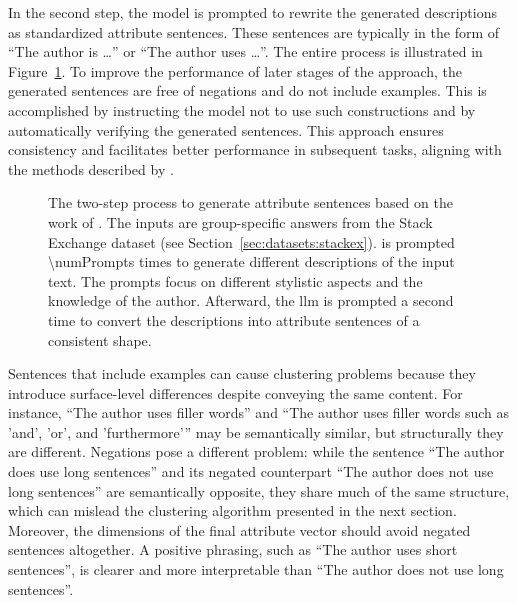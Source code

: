 In the second step, the model is prompted to rewrite the generated descriptions as standardized attribute sentences. These sentences are typically in the form of \enquote{The author is \ldots} or \enquote{The author uses \ldots}. The entire process is illustrated in Figure~\ref{fig:attributeSentenceGeneration}. To improve the performance of later stages of the approach, the generated sentences are free of negations and do not include examples. This is accomplished by instructing the model not to use such constructions and by automatically verifying the generated sentences. This approach ensures consistency and facilitates better performance in subsequent tasks, aligning with the methods described by \citet{patelLearningInterpretableStyle2023}.

\begin{figure}[h!t]
  
  \caption{The two-step process to generate attribute sentences based on the work of \citet{patelLearningInterpretableStyle2023}. The inputs are group-specific answers from the Stack Exchange dataset (see Section~\ref{sec:datasets:stackex}).  is prompted \num{\numPrompts} times to generate different descriptions of the input text. The prompts focus on different stylistic aspects and the knowledge of the author. Afterward, the \ac{llm} is prompted a second time to convert the descriptions into attribute sentences of a consistent shape.}%
  \label{fig:attributeSentenceGeneration}
\end{figure}

Sentences that include examples can cause clustering problems because they introduce surface-level differences despite conveying the same content. For instance, \enquote{The author uses filler words} and \enquote{The author uses filler words such as 'and', 'or', and 'furthermore'} may be semantically similar, but structurally they are different. Negations pose a different problem: while the sentence \enquote{The author does use long sentences} and its negated counterpart \enquote{The author does not use long sentences} are semantically opposite, they share much of the same structure, which can mislead the clustering algorithm presented in the next section. Moreover, the dimensions of the final attribute vector should avoid negated sentences altogether. A positive phrasing, such as \enquote{The author uses short sentences}, is clearer and more interpretable than \enquote{The author does not use long sentences}. %

